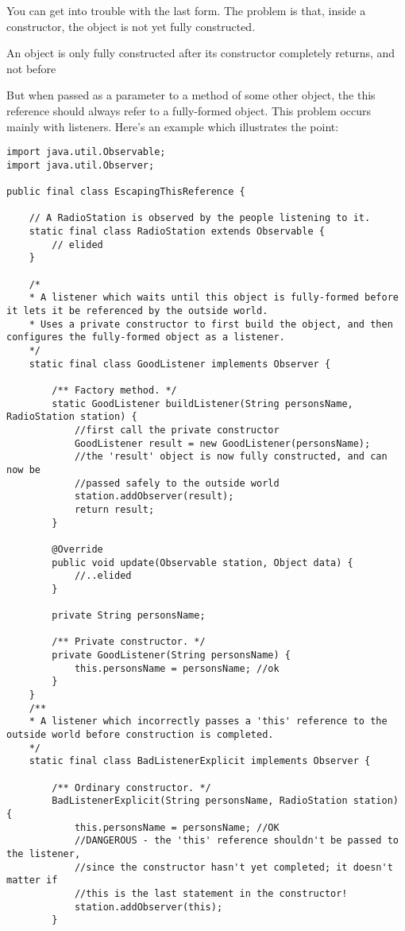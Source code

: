 You can get into trouble with the last form. The problem is that, inside a constructor, the object is not yet fully constructed.

\begin{remark}
    An object is only fully constructed after its constructor completely returns, and not before
\end{remark}

But when passed as a parameter to a method of some other object, the this reference should always refer to a fully-formed object. This problem occurs mainly with listeners. Here’s an example which illustrates the point:

\begin{verbatim}
import java.util.Observable;
import java.util.Observer;

public final class EscapingThisReference {

    // A RadioStation is observed by the people listening to it.
    static final class RadioStation extends Observable {
        // elided
    }

    /*
    * A listener which waits until this object is fully-formed before it lets it be referenced by the outside world.
    * Uses a private constructor to first build the object, and then configures the fully-formed object as a listener.
    */
    static final class GoodListener implements Observer {

        /** Factory method. */
        static GoodListener buildListener(String personsName, RadioStation station) {
            //first call the private constructor
            GoodListener result = new GoodListener(personsName);
            //the 'result' object is now fully constructed, and can now be
            //passed safely to the outside world
            station.addObserver(result);
            return result;
        }

        @Override
        public void update(Observable station, Object data) {
            //..elided
        }

        private String personsName;

        /** Private constructor. */
        private GoodListener(String personsName) {
            this.personsName = personsName; //ok
        }
    }
    /**
    * A listener which incorrectly passes a 'this' reference to the outside world before construction is completed.
    */
    static final class BadListenerExplicit implements Observer {

        /** Ordinary constructor. */
        BadListenerExplicit(String personsName, RadioStation station) {
            this.personsName = personsName; //OK
            //DANGEROUS - the 'this' reference shouldn't be passed to the listener,
            //since the constructor hasn't yet completed; it doesn't matter if
            //this is the last statement in the constructor!
            station.addObserver(this);
        }


\end{verbatim}
